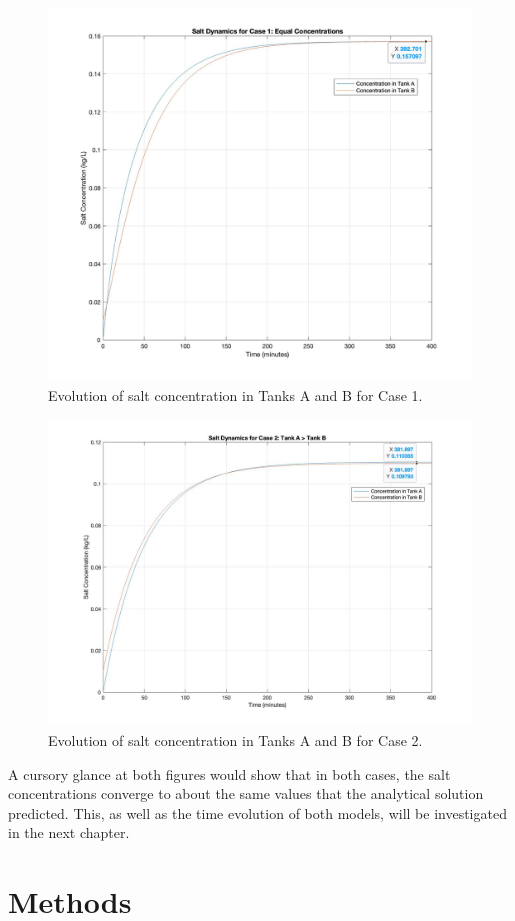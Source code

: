 \begin{figure}
\centering
\includegraphics[width=0.75\linewidth,height=\textheight,keepaspectratio]{./eq_conc.jpg}
\caption{Evolution of salt concentration in Tanks A and B for Case
1.}\label{fig:eq_conc}
\end{figure}

\begin{figure}
\centering
\includegraphics[width=0.75\linewidth,height=\textheight,keepaspectratio]{./gt_conc.jpg}
\caption{Evolution of salt concentration in Tanks A and B for Case
2.}\label{fig:gt_conc}
\end{figure}

A cursory glance at both figures would show that in both cases, the salt
concentrations converge to about the same values that the analytical
solution predicted. This, as well as the time evolution of both models,
will be investigated in the next chapter.

\section{Methods}\label{methods}

